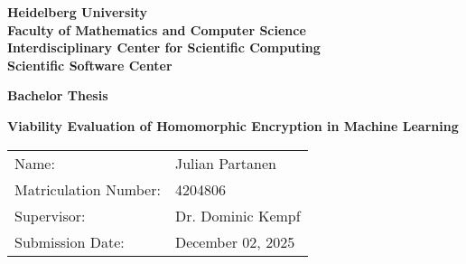 \documentclass[
     12pt,         %
     a4paper,      %
     BCOR=10mm,     %
     DIV=14,        %
     liststotoc,   %
     bibtotoc,     %
     parskip=half,       %
     openright
     ]{scrreprt}
\begin{document}
\begin{titlepage}


\vspace*{1cm}
\begin{center}
\vspace*{3cm}
\textbf{
\Large Heidelberg University\\
\smallskip
\Large Faculty of Mathematics and Computer Science\\
\smallskip
\Large Interdisciplinary Center for Scientific Computing\\
\smallskip
\Large Scientific Software Center\\
\smallskip
}

\vspace{3cm}

\textbf{\large Bachelor Thesis}

\vspace{0.5\baselineskip}
{\huge
\textbf{Viability Evaluation of Homomorphic Encryption in Machine Learning}
}
\end{center}

\vfill

{\large
\begin{tabular}[l]{ll}
Name: & Julian Partanen\\
Matriculation Number: & 4204806\\
Supervisor: & Dr. Dominic Kempf\\
Submission Date: & December 02, 2025
\end{tabular}
}

\end{titlepage}




\tableofcontents
\cleardoublepage
{}








\listoffigures



%
%

\printbibliography
\end{document}
